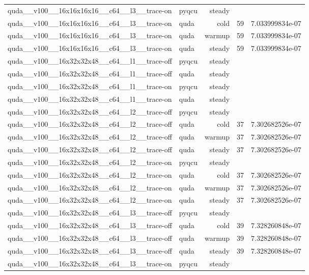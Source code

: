 \begin{table}[htbp]
\begin{tabular}{@{}llrrr@{}}
quda\_\_v100\_\_16x16x16x16\_\_c64\_\_l3\_\_trace-on & pyqcu & steady &  &  \\
quda\_\_v100\_\_16x16x16x16\_\_c64\_\_l3\_\_trace-on & quda & cold & 59 & 7.033999834e-07 \\
quda\_\_v100\_\_16x16x16x16\_\_c64\_\_l3\_\_trace-on & quda & warmup & 59 & 7.033999834e-07 \\
quda\_\_v100\_\_16x16x16x16\_\_c64\_\_l3\_\_trace-on & quda & steady & 59 & 7.033999834e-07 \\
quda\_\_v100\_\_16x32x32x48\_\_c64\_\_l1\_\_trace-off & pyqcu & steady &  &  \\
quda\_\_v100\_\_16x32x32x48\_\_c64\_\_l1\_\_trace-off & quda & steady &  &  \\
quda\_\_v100\_\_16x32x32x48\_\_c64\_\_l1\_\_trace-on & pyqcu & steady &  &  \\
quda\_\_v100\_\_16x32x32x48\_\_c64\_\_l1\_\_trace-on & quda & steady &  &  \\
quda\_\_v100\_\_16x32x32x48\_\_c64\_\_l2\_\_trace-off & pyqcu & steady &  &  \\
quda\_\_v100\_\_16x32x32x48\_\_c64\_\_l2\_\_trace-off & quda & cold & 37 & 7.302682526e-07 \\
quda\_\_v100\_\_16x32x32x48\_\_c64\_\_l2\_\_trace-off & quda & warmup & 37 & 7.302682526e-07 \\
quda\_\_v100\_\_16x32x32x48\_\_c64\_\_l2\_\_trace-off & quda & steady & 37 & 7.302682526e-07 \\
quda\_\_v100\_\_16x32x32x48\_\_c64\_\_l2\_\_trace-on & pyqcu & steady &  &  \\
quda\_\_v100\_\_16x32x32x48\_\_c64\_\_l2\_\_trace-on & quda & cold & 37 & 7.302682526e-07 \\
quda\_\_v100\_\_16x32x32x48\_\_c64\_\_l2\_\_trace-on & quda & warmup & 37 & 7.302682526e-07 \\
quda\_\_v100\_\_16x32x32x48\_\_c64\_\_l2\_\_trace-on & quda & steady & 37 & 7.302682526e-07 \\
quda\_\_v100\_\_16x32x32x48\_\_c64\_\_l3\_\_trace-off & pyqcu & steady &  &  \\
quda\_\_v100\_\_16x32x32x48\_\_c64\_\_l3\_\_trace-off & quda & cold & 39 & 7.328260848e-07 \\
quda\_\_v100\_\_16x32x32x48\_\_c64\_\_l3\_\_trace-off & quda & warmup & 39 & 7.328260848e-07 \\
quda\_\_v100\_\_16x32x32x48\_\_c64\_\_l3\_\_trace-off & quda & steady & 39 & 7.328260848e-07 \\
quda\_\_v100\_\_16x32x32x48\_\_c64\_\_l3\_\_trace-on & pyqcu & steady &  &  \\

\end{tabular}
\end{table}
